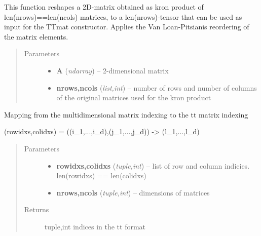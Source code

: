 \documentclass[a4paper,10pt,english]{sphinxmanual}
\begin{document}

\begin{fulllineitems}
\label{api-core:TensorToolbox.core.matkron_to_mattensor}
This function reshapes a 2D-matrix obtained as kron product of len(nrows)==len(ncols) matrices, to a len(nrows)-tensor that can be used as input for the TTmat constructor. Applies the Van Loan-Pitsianis reordering of the matrix elements.
\begin{quote}\begin{description}
\item[{Parameters}] \leavevmode\begin{itemize}
\item {} 
\textbf{A} (\emph{ndarray}) -- 2-dimensional matrix

\item {} 
\textbf{nrows,ncols} (\emph{list,int}) -- number of rows and number of columns of the original matrices used for the kron product

\end{itemize}

\end{description}\end{quote}

\end{fulllineitems}


\begin{fulllineitems}
\label{api-core:TensorToolbox.core.mat_to_tt_idxs}
Mapping from the multidimensional matrix indexing to the tt matrix indexing

(rowidxs,colidxs) = ((i\_1,...,i\_d),(j\_1,...,j\_d)) -\textgreater{} (l\_1,...,l\_d)
\begin{quote}\begin{description}
\item[{Parameters}] \leavevmode\begin{itemize}
\item {} 
\textbf{rowidxs,colidxs} (\emph{tuple,int}) -- list of row and column indicies. len(rowidxs) == len(colidxs)

\item {} 
\textbf{nrows,ncols} (\emph{tuple,int}) -- dimensions of matrices

\end{itemize}

\item[{Returns}] \leavevmode
tuple,int indices in the tt format

\end{description}\end{quote}

\end{fulllineitems}
\end{document}
